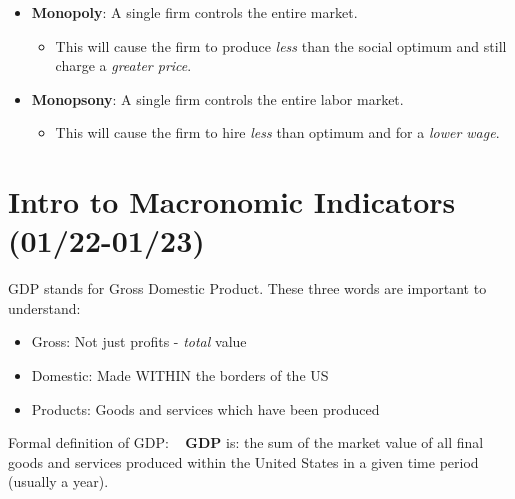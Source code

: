 \documentclass[
  letterpaper,
  DIV=11,
  numbers=noendperiod]{scrartcl}
\providecommand{\tightlist}{%
  \setlength{\itemsep}{0pt}\setlength{\parskip}{0pt}}\usepackage{longtable,booktabs,array}
\begin{document}
\begin{itemize}
\tightlist
\item
  \textbf{Monopoly}: A single firm controls the entire market.

  \begin{itemize}
  \tightlist
  \item
    This will cause the firm to produce \emph{less} than the social
    optimum and still charge a \emph{greater price}.
  \end{itemize}
\item
  \textbf{Monopsony}: A single firm controls the entire labor market.

  \begin{itemize}
  \tightlist
  \item
    This will cause the firm to hire \emph{less} than optimum and for a
    \emph{lower wage}.
  \end{itemize}
\end{itemize}

\hypertarget{intro-to-macronomic-indicators-0122-0123}{%
\section{Intro to Macronomic Indicators
(01/22-01/23)}\label{intro-to-macronomic-indicators-0122-0123}}

GDP stands for Gross Domestic Product. These three words are important
to understand:

\begin{itemize}
\tightlist
\item
  Gross: Not just profits - \emph{total} value
\item
  Domestic: Made WITHIN the borders of the US
\item
  Products: Goods and services which have been produced
\end{itemize}

Formal definition of GDP: ~ \textbf{GDP} is: the sum of the market value
of all final goods and services produced within the United States in a
given time period (usually a year).

\newpage{}
\end{document}
